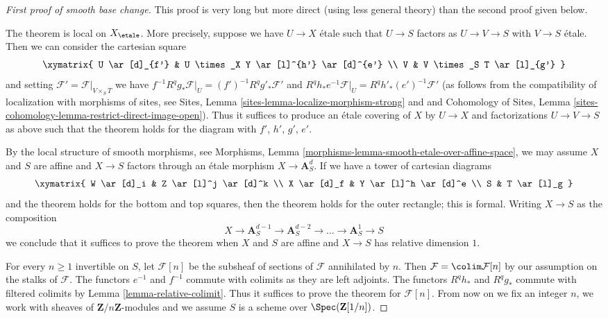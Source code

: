 \begin{proof}[First proof of smooth base change]
This proof is very long but more direct (using less general theory)
than the second proof given below.

\medskip\noindent
The theorem is local on $X_\etale$. More precisely, suppose we have
$U \to X$ \'etale such that $U \to S$ factors as $U \to V \to S$
with $V \to S$ \'etale. Then we can consider the cartesian square
$$
\xymatrix{
U \ar[d]_{f'} & U \times_X Y \ar[l]^{h'} \ar[d]^{e'} \\
V & V \times_S T \ar[l]_{g'}
}
$$
and setting $\mathcal{F}' = \mathcal{F}|_{V \times_S T}$
we have $f^{-1}R^qg_*\mathcal{F}|_U = (f')^{-1}R^qg'_*\mathcal{F}'$
and $R^qh_*e^{-1}\mathcal{F}|_U = R^qh'_*(e')^{-1}\mathcal{F}'$
(as follows from the compatibility of localization with morphisms of sites, see
Sites, Lemma \ref{sites-lemma-localize-morphism-strong} and
and
Cohomology of Sites, Lemma
\ref{sites-cohomology-lemma-restrict-direct-image-open}).
Thus it suffices to produce an \'etale covering of $X$ by
$U \to X$ and factorizations $U \to V \to S$
as above such that the theorem holds for the diagram with
$f'$, $h'$, $g'$, $e'$.

\medskip\noindent
By the local structure of smooth morphisms, see
Morphisms, Lemma \ref{morphisms-lemma-smooth-etale-over-affine-space},
we may assume $X$ and $S$ are affine and $X \to S$
factors through an \'etale morphism $X \to \mathbf{A}^d_S$.
If we have a tower of cartesian diagrams
$$
\xymatrix{
W \ar[d]_i & Z \ar[l]^j \ar[d]^k \\
X \ar[d]_f & Y \ar[l]^h \ar[d]^e \\
S & T \ar[l]_g
}
$$
and the theorem holds for the bottom and top squares, then
the theorem holds for the outer rectangle; this is formal.
Writing $X \to S$ as the composition
$$
X \to \mathbf{A}^{d - 1}_S \to \mathbf{A}^{d - 2}_S \to \ldots \to
\mathbf{A}^1_S \to S
$$
we conclude that it suffices to prove the theorem when $X$ and $S$
are affine and $X \to S$ has relative dimension $1$.

\medskip\noindent
For every $n \geq 1$ invertible on $S$, let $\mathcal{F}[n]$
be the subsheaf of sections of $\mathcal{F}$ annihilated by $n$. Then
$\mathcal{F} = \colim \mathcal{F}[n]$ by our assumption on
the stalks of $\mathcal{F}$. The functors $e^{-1}$ and $f^{-1}$
commute with colimits as they are left adjoints. The functors
$R^qh_*$ and $R^qg_*$ commute with filtered colimits by
Lemma \ref{lemma-relative-colimit}.
Thus it suffices to prove the theorem for $\mathcal{F}[n]$.
From now on we fix an integer $n$, we work with
sheaves of $\mathbf{Z}/n\mathbf{Z}$-modules and
we assume $S$ is a scheme over $\Spec(\mathbf{Z}[1/n])$.


\end{proof}
